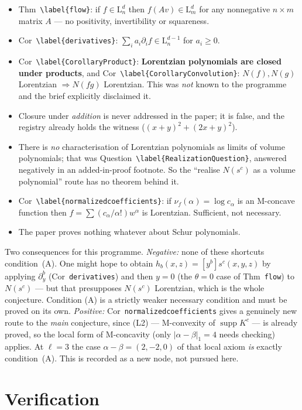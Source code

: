 \documentclass[11pt]{article}
\theoremstyle{plain}
\theoremstyle{definition}
\DeclareMathOperator{\supp}{supp}
\begin{document}
\begin{itemize}
\item Thm~\verb|\label{flow}|: if $f\in\mathrm L^d_n$ then $f(Av)\in\mathrm L^d_m$ for any
nonnegative $n\times m$ matrix $A$ --- no positivity, invertibility or squareness.
\item Cor~\verb|\label{derivatives}|: $\sum_i a_i\partial_i f\in\mathrm L^{d-1}_n$ for
$a_i\ge0$.
\item Cor~\verb|\label{CorollaryProduct}|: \textbf{Lorentzian polynomials are closed under
products}, and Cor~\verb|\label{CorollaryConvolution}|: $N(f),N(g)$ Lorentzian
$\Rightarrow N(fg)$ Lorentzian. This was \emph{not} known to the programme and the brief
explicitly disclaimed it.
\item Closure under \emph{addition} is never addressed in the paper; it is false, and the
registry already holds the witness ($({x+y})^2+(2x+y)^2$).
\item There is \emph{no} characterisation of Lorentzian polynomials as limits of volume
polynomials; that was Question~\verb|\label{RealizationQuestion}|, answered negatively in
an added-in-proof footnote. So the ``realise $N(s^c)$ as a volume polynomial'' route has no
theorem behind it.
\item Cor~\verb|\label{normalizedcoefficients}|: if $\nu_f(\alpha)=\log c_\alpha$ is an
M-concave function then $f=\sum(c_\alpha/\alpha!)w^\alpha$ is Lorentzian. Sufficient, not
necessary.
\item The paper proves nothing whatever about Schur polynomials.
\end{itemize}

Two consequences for this programme. \emph{Negative:} none of these shortcuts
condition~(A). One might hope to obtain $h_b(x,z)=[y^b]s^c(x,y,z)$ by applying
$\partial_y^b$ (Cor~\verb|derivatives|) and then $y=0$ (the $\theta=0$ case of
Thm~\verb|flow|) to $N(s^c)$ --- but that presupposes $N(s^c)$ Lorentzian, which is the
whole conjecture. Condition (A) is a strictly weaker necessary condition and must be proved
on its own. \emph{Positive:} Cor~\verb|normalizedcoefficients| gives a genuinely new route
to the \emph{main} conjecture, since (L2) --- M-convexity of $\supp K^c$ --- is already
proved, so the local form of M-concavity (only $|\alpha-\beta|_1=4$ needs checking) applies.
At $\ell=3$ the case $\alpha-\beta=(2,-2,0)$ of that local axiom \emph{is} exactly
condition~(A). This is recorded as a new node, not pursued here.

\section{Verification}
\end{document}
